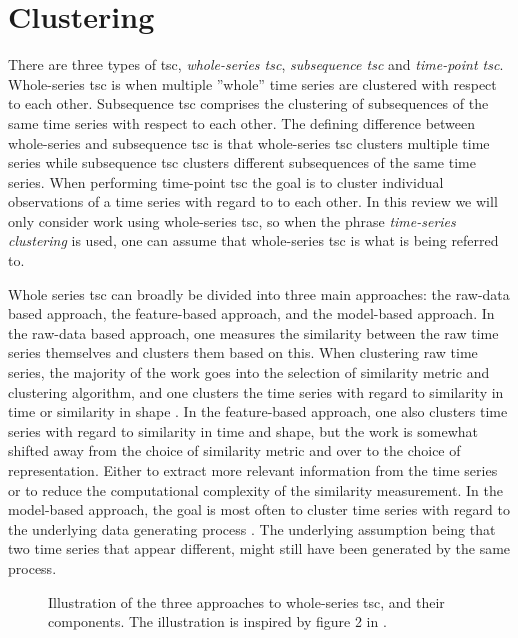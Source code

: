 \section{Clustering} \label{sec:theory_clust}
There are three types of \acrfull{tsc}, \textit{whole-series \acrshort{tsc}}, \textit{subsequence \acrshort{tsc}} and \textit{time-point \acrshort{tsc}}. Whole-series \acrshort{tsc} is when multiple ''whole'' time series are clustered with respect to each other. Subsequence \acrshort{tsc} comprises the clustering of subsequences of the same time series with respect to each other. The defining difference between whole-series and subsequence \acrshort{tsc} is that whole-series \acrshort{tsc} clusters multiple time series while subsequence \acrshort{tsc} clusters different subsequences of the same time series. When performing time-point \acrshort{tsc} the goal is to cluster individual observations of a time series with regard to to each other. In this review we will only consider work using whole-series \acrshort{tsc}, so when the phrase \textit{time-series clustering} is used, one can assume that whole-series \acrshort{tsc} is what is being referred to. \bigskip

Whole series \acrshort{tsc} can broadly be divided into three main approaches: the raw-data based approach, the feature-based approach, and the model-based approach. In the raw-data based approach, one measures the similarity between the raw time series themselves and clusters them based on this. When clustering raw time series, the majority of the work goes into the selection of similarity metric and clustering algorithm, and one clusters the time series with regard to similarity in time or similarity in shape \cite{tsc_rev}. In the feature-based approach, one also clusters time series with regard to similarity in time and shape, but the work is somewhat shifted away from the choice of similarity metric and over to the choice of representation. Either to extract more relevant information from the time series or to reduce the computational complexity of the similarity measurement. In the model-based approach, the goal is most often to cluster time series with regard to the underlying data generating process \cite{moar_mpl_tsc}. The underlying assumption being that two time series that appear different, might still have been generated by the same process.

\begin{figure}
    \begin{center}
    
    \end{center}
    \caption{Illustration of the three approaches to whole-series \acrshort{tsc}, and their components. The illustration is inspired by figure 2 in \textcite{tsc_rev}.}
    \label{fig:tsc_approaches}
\end{figure}

